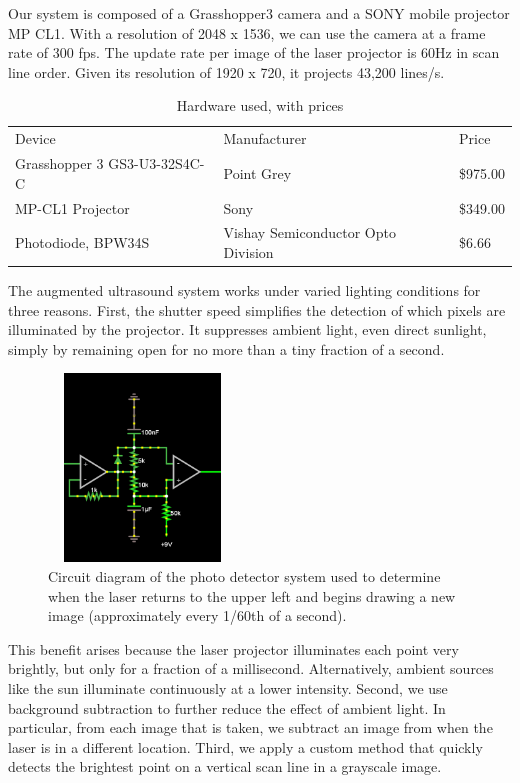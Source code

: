 \documentclass{llncs}
\begin{document}
Our system is composed of a Grasshopper3 camera and a SONY mobile projector MP CL1. With a resolution of 2048 x 1536, we can use the camera at a frame rate of 300 fps. The update rate per image of the laser projector is 60Hz in scan line order. Given its resolution of 1920 x 720, it projects 43,200 lines/s.
\begin{table}
\caption{Hardware used, with prices}
\begin{tabular}{lll}
\hline\noalign{\smallskip}
Device & Manufacturer & Price \\ \noalign{\smallskip}\hline\noalign{\smallskip} 
Grasshopper 3 GS3-U3-32S4C-C & Point Grey &  \$975.00\\ 
MP-CL1 Projector & Sony & \$349.00 \\ 
Photodiode, BPW34S & Vishay Semiconductor Opto Division & \$6.66 \\ \hline
\end{tabular}
\end{table}

The augmented ultrasound system works under varied lighting conditions for three reasons. First, the shutter speed simplifies the detection of which pixels are illuminated by the projector. It suppresses ambient light, even direct sunlight, simply by remaining open for no more than a tiny fraction of a second.

\begin{figure}
\centering
\includegraphics[width=5cm,height=5cm,keepaspectratio]{circuit}
\caption{
Circuit diagram of the photo detector system used to determine when the laser returns to the upper left and begins drawing a new image (approximately every 1/60th of a second).
}
\end{figure}
This benefit arises because the laser projector illuminates each point very brightly, but only for a fraction of a millisecond. Alternatively, ambient sources like the sun illuminate continuously at a lower intensity. Second, we use background subtraction to further reduce the effect of ambient light. In particular, from each image that is taken, we subtract an image from when the laser is in a different location.  Third, we apply a custom method that quickly detects the brightest point on a vertical scan line in a grayscale image.
\end{document}
